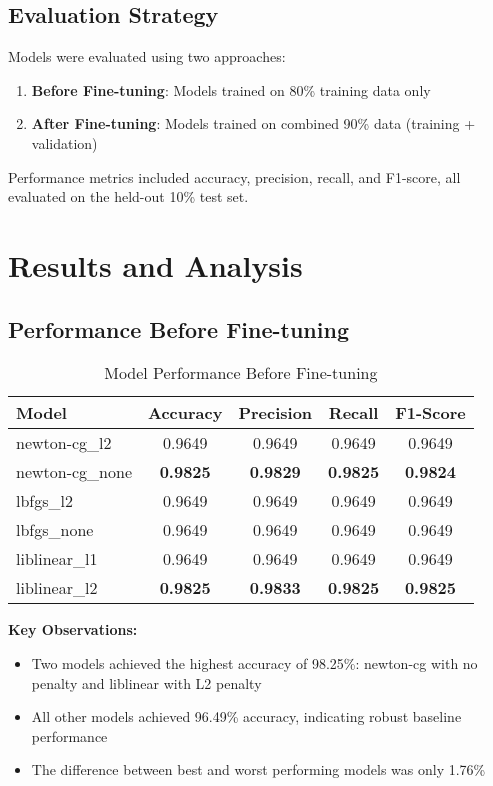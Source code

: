\documentclass[12pt,a4paper]{article}
\begin{document}
\subsection{Evaluation Strategy}
Models were evaluated using two approaches:
\begin{enumerate}
    \item \textbf{Before Fine-tuning}: Models trained on 80\% training data only
    \item \textbf{After Fine-tuning}: Models trained on combined 90\% data (training + validation)
\end{enumerate}

Performance metrics included accuracy, precision, recall, and F1-score, all evaluated on the held-out 10\% test set.

\section{Results and Analysis}

\subsection{Performance Before Fine-tuning}

\begin{table}[H]
\centering
\caption{Model Performance Before Fine-tuning}
\begin{tabular}{|l|c|c|c|c|}
\hline
\textbf{Model} & \textbf{Accuracy} & \textbf{Precision} & \textbf{Recall} & \textbf{F1-Score} \\
\hline
newton-cg\_l2 & 0.9649 & 0.9649 & 0.9649 & 0.9649 \\
newton-cg\_none & \textbf{0.9825} & \textbf{0.9829} & \textbf{0.9825} & \textbf{0.9824} \\
lbfgs\_l2 & 0.9649 & 0.9649 & 0.9649 & 0.9649 \\
lbfgs\_none & 0.9649 & 0.9649 & 0.9649 & 0.9649 \\
liblinear\_l1 & 0.9649 & 0.9649 & 0.9649 & 0.9649 \\
liblinear\_l2 & \textbf{0.9825} & \textbf{0.9833} & \textbf{0.9825} & \textbf{0.9825} \\
\hline
\end{tabular}
\end{table}

\textbf{Key Observations:}
\begin{itemize}
    \item Two models achieved the highest accuracy of 98.25\%: newton-cg with no penalty and liblinear with L2 penalty
    \item All other models achieved 96.49\% accuracy, indicating robust baseline performance
    \item The difference between best and worst performing models was only 1.76\%
\end{itemize}
\end{document}
